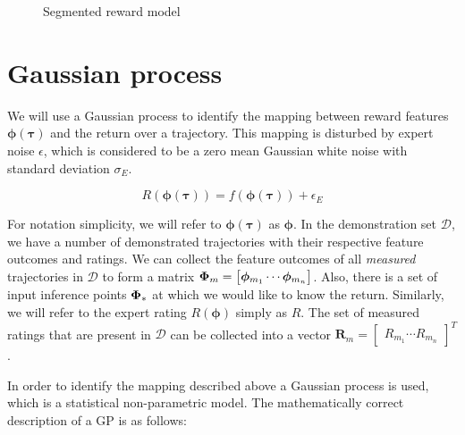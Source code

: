 \documentclass[mscThesis.tex]{subfiles}
\begin{document}
\begin{figure}[!ht]
\caption{Segmented reward model}
\label{fig:unsegmented-rm}
\end{figure}

\section{Gaussian process}
\label{sec:GP}
We will use a Gaussian process \cite{rasmussen2006book} to identify the mapping between reward features $\bm{\phi}(\bm{\tau})$ and the return over a trajectory. This mapping is disturbed by expert noise $\epsilon$, which is considered to be a zero mean Gaussian white noise with standard deviation $\sigma_E$. 

\begin{equation*}
R(\bm{\phi}(\bm{\tau})) = f(\bm{\phi}(\bm{\tau})) + \epsilon_E
\end{equation*}

For notation simplicity, we will refer to $\bm{\phi}(\bm{\tau})$ as $\bm{\phi}$. In the demonstration set $\mathcal{D}$, we have a number of demonstrated trajectories with their respective feature outcomes and ratings. We can collect the feature outcomes of all \emph{measured} trajectories in $\mathcal{D}$ to form a matrix $\mathbf{\Phi}_m = \begin{bmatrix} \bm{\phi}_{m_1} \cdots \bm{\phi}_{m_n} \end{bmatrix}$.  Also, there is a set of input inference points $\mathbf{\Phi}_{*}$ at which we would like to know the return. Similarly, we will refer to the expert rating $R(\bm{\phi})$ simply as $R$. The set of measured ratings that are present in $\mathcal{D}$ can be collected into a vector $\bm{R}_m = \begin{bmatrix} R_{m_1} \cdots R_{m_n} \end{bmatrix}^T$.

In order to identify the mapping described above a Gaussian process is used, which is a statistical non-parametric model. The mathematically correct description of a GP is as follows:
\end{document}
